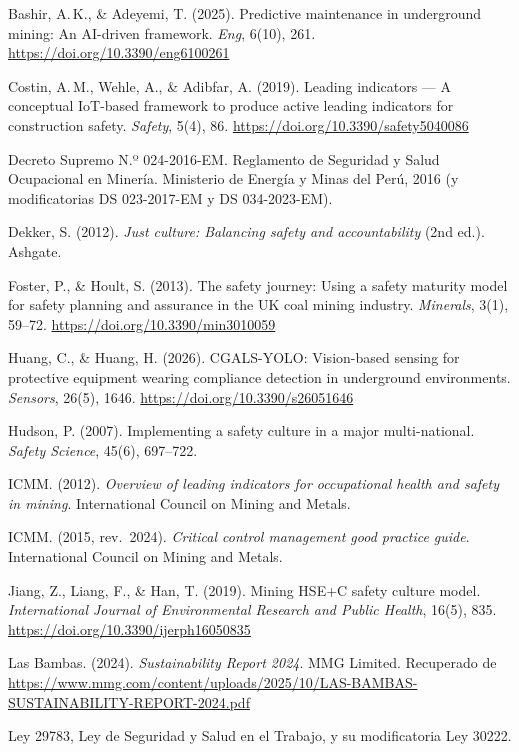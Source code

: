 \documentclass[12pt,a4paper]{article}
\begin{document}
\begingroup
\small
\setlength{\parskip}{4pt}
\setlength{\parindent}{0pt}
\renewcommand{\baselinestretch}{1.0}\selectfont

Bashir, A.\,K., \& Adeyemi, T. (2025). Predictive maintenance in underground mining: An AI-driven framework. \textit{Eng}, 6(10), 261. \url{https://doi.org/10.3390/eng6100261}

Costin, A.\,M., Wehle, A., \& Adibfar, A. (2019). Leading indicators --- A conceptual IoT-based framework to produce active leading indicators for construction safety. \textit{Safety}, 5(4), 86. \url{https://doi.org/10.3390/safety5040086}

Decreto Supremo N.º 024-2016-EM. Reglamento de Seguridad y Salud Ocupacional en Minería. Ministerio de Energía y Minas del Perú, 2016 (y modificatorias DS 023-2017-EM y DS 034-2023-EM).

Dekker, S. (2012). \textit{Just culture: Balancing safety and accountability} (2nd ed.). Ashgate.

Foster, P., \& Hoult, S. (2013). The safety journey: Using a safety maturity model for safety planning and assurance in the UK coal mining industry. \textit{Minerals}, 3(1), 59--72. \url{https://doi.org/10.3390/min3010059}

Huang, C., \& Huang, H. (2026). CGALS-YOLO: Vision-based sensing for protective equipment wearing compliance detection in underground environments. \textit{Sensors}, 26(5), 1646. \url{https://doi.org/10.3390/s26051646}

Hudson, P. (2007). Implementing a safety culture in a major multi-national. \textit{Safety Science}, 45(6), 697--722.

ICMM. (2012). \textit{Overview of leading indicators for occupational health and safety in mining}. International Council on Mining and Metals.

ICMM. (2015, rev.\ 2024). \textit{Critical control management good practice guide}. International Council on Mining and Metals.

Jiang, Z., Liang, F., \& Han, T. (2019). Mining HSE+C safety culture model. \textit{International Journal of Environmental Research and Public Health}, 16(5), 835. \url{https://doi.org/10.3390/ijerph16050835}

Las Bambas. (2024). \textit{Sustainability Report 2024}. MMG Limited. Recuperado de \url{https://www.mmg.com/content/uploads/2025/10/LAS-BAMBAS-SUSTAINABILITY-REPORT-2024.pdf}

Ley 29783, Ley de Seguridad y Salud en el Trabajo, y su modificatoria Ley 30222.
\end{document}
